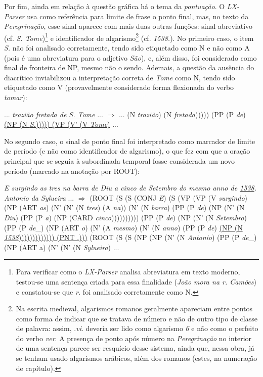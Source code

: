 \documentclass[portuguese]{textolivre}
\begin{document}
Por fim, ainda em relação à questão gráfica há o tema da \textit{pontuação}. O \textit{LX-Parser} usa como referência para limite de frase o ponto final, mas, no texto da \textit{Peregrinação}, esse sinal aparece com mais duas outras funções: sinal abreviativo (cf. \textit{S. Tome})\footnote{Para verificar como o \textit{LX-Parser} analisa abreviatura em texto moderno, testou-se uma sentença criada para essa finalidade (\textit{João mora na r. Camões}) e constatou-se que \textit{r.} foi analisado corretamente como N.} e identificador de algarismo\footnote{Na escrita medieval, algarismos romanos geralmente apareciam entre pontos como forma de indicar que se tratava de número e não de outro tipo de classe de palavra: assim, .\textit{vi}. deveria ser lido como algarismo \textit{6} e não como o perfeito do verbo \textit{ver}. A presença de ponto após número na \textit{Peregrinação} no interior de uma sentença parece ser resquício desse sistema, ainda que, nessa obra, já se tenham usado algarismos arábicos, além dos romanos (estes, na numeração de capítulo).} (cf. \textit{1538.}). No primeiro caso, o item \textit{S.} não foi analisado corretamente, tendo sido etiquetado como N e não como A (pois é uma abreviatura para o adjetivo \textit{São}), e, além disso, foi considerado como final de fronteira de NP, mesmo não o sendo. Ademais, a questão da ausência do diacrítico inviabilizou a interpretação correta de \textit{Tome} como N, tendo sido etiquetado como V (provavelmente considerado forma flexionada do verbo \textit{tomar}):

\begin{description}[topsep=10pt, parsep=2pt, itemindent=!]
\item[(11)\label{11}] ... \textit{trazião fretada de \uline{S. Tome}} ... $\Rightarrow$ ... (N \textit{trazião}) (N \textit{fretada}))))) (PP (P \textit{de}) \uline{(NP (N \textit{S.}))))) (VP (V' (V \textit{Tome})} ...
\end{description}

No segundo caso, o sinal de ponto final foi interpretado como marcador de limite de período (e não como identificador de algarismo), o que fez com que a oração principal que se seguia à subordinada temporal fosse considerada um novo período (marcado na anotação por ROOT):


\begin{description}[topsep=10pt, parsep=2pt, itemindent=!]
\item[(12)\label{12}] \textit{E surgindo as tres na barra de Diu a cinco de Setembro do mesmo anno de \uline{1538}. Antonio da Sylueira} ... $\Rightarrow$ (ROOT (S (S (CONJ \textit{E}) (S (VP (VP (V \textit{surgindo}) (NP (ART \textit{as}) (N' (N' (N \textit{tres}) (A \textit{na})) (N' (N \textit{barra}) (PP (P \textit{de}) (NP (N' (N \textit{Diu}) (PP (P \textit{a}) (NP (CARD \textit{cinco})))))))))) (PP (P \textit{de}) (NP (N' (N \textit{Setembro}) (PP (P \textit{de}\_) (NP (ART \textit{o}) (N' (A \textit{mesmo}) (N' (N \textit{anno}) (PP (P \textit{de}) \uline{(NP (N \textit{1538}))))))))))))) (PNT .)))} (ROOT (S (S (NP (NP (N' (N \textit{Antonio}) (PP (P \textit{de}\_) (NP (ART a) (N' (N' (N \textit{Sylueira}) ...
\end{description}
\end{document}
